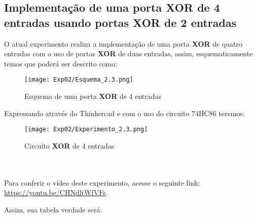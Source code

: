 \documentclass[12pt]{article}
\begin{document}
\subsection{Implementação de uma porta \textbf{XOR} de 4 entradas usando portas \textbf{XOR} de 2 entradas}
O atual experimento realiza a implementação de uma porta \textbf{XOR} de quatro entradas com o uso de portas \textbf{XOR} de duas entradas, assim, esquematicamente temos que poderá ser descrito como:

\begin{figure}[H]
    \centering
    \texttt{[image: Exp02/Esquema\_2.3.png]}
    \caption{Esquema de uma porta \textbf{XOR} de 4 entradas}\label{fig:Esquema_Experimento2_2.3}
\end{figure}

Expressando através do Thinkercad e com o uso do circuito 74HC86 teremos:

\begin{figure}[H]
    \centering
    \texttt{[image: Exp02/Experimento\_2.3.png]}
    \caption{Circuito \textbf{XOR} de 4 entradas}\label{fig:Esquema_Experimento2_2.3}
\end{figure}

\\
\\
Para conferir o vídeo deste experimento, acesse o seguinte link:
\href{https://youtu.be/CHNdltWfVFs}{https://youtu.be/CHNdltWfVFs}.

Assim, sua tabela verdade será:
\end{document}
